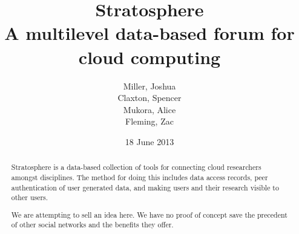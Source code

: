 

\usepackage{titlesec}
\titleformat{\subsection}[hang]{\centering\bfseries}{}{1em}{}

\title{
  Stratosphere \\ 
  \small{A multilevel data-based forum for cloud computing}
} 

\author{
  Miller, Joshua \\
  Claxton, Spencer \\
  Mukora, Alice \\
  Fleming, Zac
}

\date{\small{18 June 2013}}




\maketitle

\begin{abstract}

  Stratosphere is a data-based collection of tools for connecting
  cloud researchers amongst disciplines.  The method for doing this
  includes data access records, peer authentication of user
  generated data, and making users and their research visible to other users.

  We are attempting to sell an idea here. We have no proof of concept
  save the precedent of other social networks and the benefits they offer.

\end{abstract}

